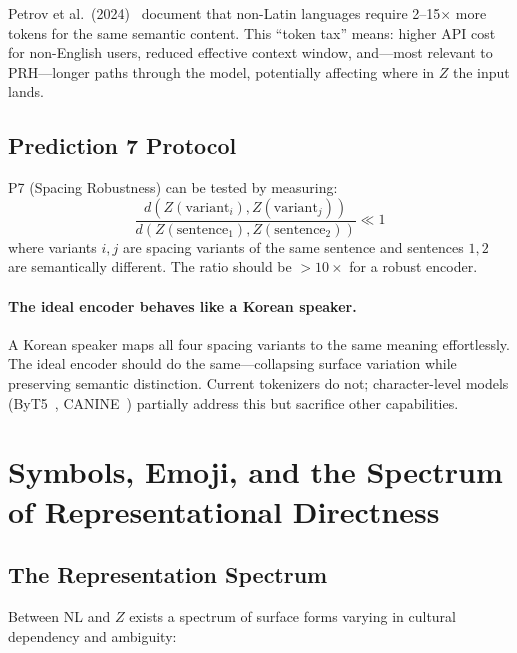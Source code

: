 \documentclass{article}
\theoremstyle{definition}
\begin{document}
Petrov et al.\ (2024)~\citep{petrov2024tokenizers} document that non-Latin languages require 2--15$\times$ more tokens for the same semantic content. This ``token tax'' means: higher API cost for non-English users, reduced effective context window, and---most relevant to PRH---longer paths through the model, potentially affecting where in $Z$ the input lands.

\subsection{Prediction 7 Protocol}

P7 (Spacing Robustness) can be tested by measuring:
\[
\frac{d(Z(\text{variant}_i), Z(\text{variant}_j))}{d(Z(\text{sentence}_1), Z(\text{sentence}_2))} \ll 1
\]
where variants $i,j$ are spacing variants of the same sentence and sentences $1,2$ are semantically different. The ratio should be $> 10\times$ for a robust encoder.

\paragraph{The ideal encoder behaves like a Korean speaker.}
A Korean speaker maps all four spacing variants to the same meaning effortlessly. The ideal encoder should do the same---collapsing surface variation while preserving semantic distinction. Current tokenizers do not; character-level models (ByT5~\citep{xue2022byt5}, CANINE~\citep{clark2022canine}) partially address this but sacrifice other capabilities.

\section{Symbols, Emoji, and the Spectrum of Representational Directness}\label{app:emoji}

\subsection{The Representation Spectrum}

Between NL and $Z$ exists a spectrum of surface forms varying in cultural dependency and ambiguity:
\end{document}
